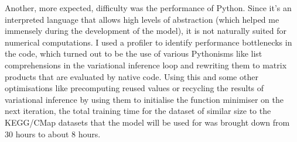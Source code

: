 \documentclass[12pt,a4]{article}
\begin{document}
Another, more expected, difficulty was the performance of Python. Since it's an interpreted language that allows high levels of abstraction (which helped me immensely during the development of the model), it is not naturally suited for numerical computations. I used a profiler to identify performance bottlenecks in the code, which turned out to be the use of various Pythonisms like list comprehensions in the variational inference loop and rewriting them to matrix products that are evaluated by native code. Using this and some other optimisations like precomputing reused values or recycling the results of variational inference by using them to initialise the function minimiser on the next iteration, the total training time for the dataset of similar size to the KEGG/CMap datasets that the model will be used for was brought down from 30 hours to about 8 hours.
\end{document}
